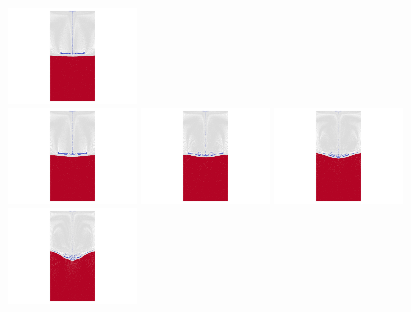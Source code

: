 \begin{center}
\includegraphics[width=3.4cm]{python_codes/fieldstone_67/dripping/converted_0007.jpg}\\
\includegraphics[width=3.4cm]{python_codes/fieldstone_67/dripping/converted_0008.jpg}
\includegraphics[width=3.4cm]{python_codes/fieldstone_67/dripping/converted_0009.jpg}
\includegraphics[width=3.4cm]{python_codes/fieldstone_67/dripping/converted_0010.jpg}
\includegraphics[width=3.4cm]{python_codes/fieldstone_67/dripping/converted_0011.jpg}
\end{center}


